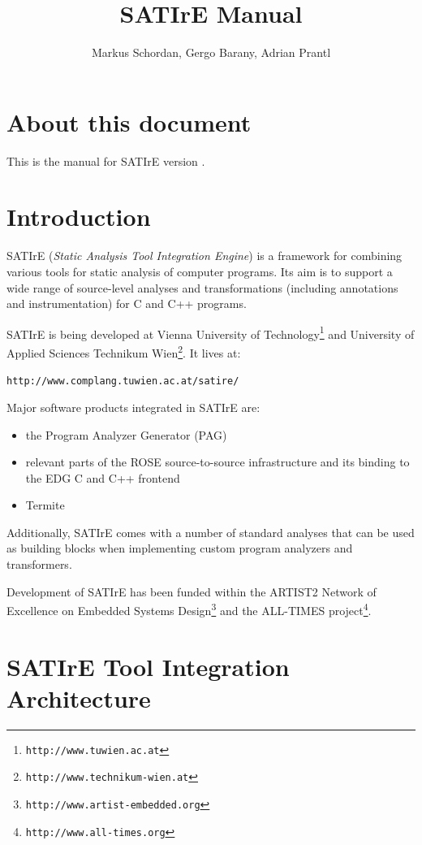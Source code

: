 \documentclass[a4paper,12pt]{report}
\title{SATIrE Manual}
\author{Markus Schordan, Gergo Barany, Adrian Prantl}
\begin{document}
\maketitle

\chapter*{About this document}

This is the manual for SATIrE version \version.

\tableofcontents

\chapter{Introduction}
\label{chap:introduction}

SATIrE (\emph{Static Analysis Tool Integration Engine}) is a framework for
combining various tools for static analysis of computer programs. Its aim is
to support a wide range of source-level analyses and transformations
(including annotations and instrumentation) for C and C++ programs.

SATIrE is being developed at Vienna University of
Technology\footnote{\texttt{http://www.tuwien.ac.at}} and University of
Applied Sciences Technikum
Wien\footnote{\texttt{http://www.technikum-wien.at}}. It lives at:
\begin{center}
\verb|http://www.complang.tuwien.ac.at/satire/|
\end{center}

Major software products integrated in SATIrE are:
\begin{itemize}
\item the Program Analyzer Generator (PAG)
\item relevant parts of the ROSE source-to-source infrastructure and its
binding to the EDG C and C++ frontend
\item Termite
\end{itemize}

Additionally, SATIrE comes with a number of standard analyses that can be
used as building blocks when implementing custom program analyzers and
transformers.

Development of SATIrE has been funded within the ARTIST2 Network of
Excellence on Embedded Systems
Design\footnote{\texttt{http://www.artist-embedded.org}} and the ALL-TIMES
project\footnote{\texttt{http://www.all-times.org}}.

\chapter{SATIrE Tool Integration Architecture}
\end{document}
